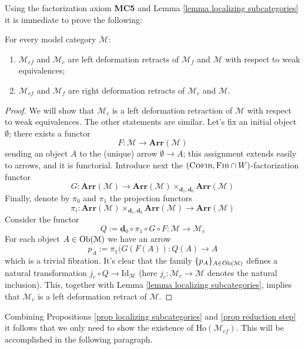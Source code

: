 \begin{refsection}
Using the factorization axiom {\bfseries MC5} and Lemma \ref{lemma localizing subcategories} it is immediate to prove the following:

\begin{prop} \label{prop reduction step}
For every model category $\mathcal M$:
\begin{enumerate}
\item $\mathcal M_{cf}$ and $\mathcal M_c$ are left deformation retracts of $\mathcal M_f$ and $\mathcal M$ with respect to weak equivalences;
\item $\mathcal M_{cf}$ and $\mathcal M_f$ are right deformation retracts of $\mathcal M_c$ and $\mathcal M$.
\end{enumerate}
\end{prop}

\begin{proof}
We will show that $\mathcal M_c$ is a left deformation retraction of $\mathcal M$ with respect to weak equivalences. The other statements are similar. Let's fix an initial object $\emptyset$; there exists a functor
\[
F \colon \mathcal M \to \mathbf{Arr}(\mathcal M)
\]
sending an object $A$ to the (unique) arrow $\emptyset \to A$; this assignment extends easily to arrows, and it is functorial. Introduce next the $(\textsc{Cofib},\textsc{Fib} \cap W)$-factorization functor
\[
G \colon \mathbf{Arr}(\mathcal M) \to \mathbf{Arr}(\mathcal M) \times_{\mathbf d_1, \mathbf d_0} \mathbf{Arr}(\mathcal M)
\]
Finally, denote by $\pi_0$ and $\pi_1$ the projection functors
\[
\pi_i \colon \mathbf{Arr}(\mathcal M) \times_{\mathbf d_1, \mathbf d_0} \mathbf{Arr}(\mathcal M) \to \mathbf{Arr}(\mathcal M)
\]
Consider the functor
\[
Q := \mathbf d_0 \circ \pi_1 \circ G \circ F \colon \mathcal M \to \mathcal M_c
\]
For each object $A \in \operatorname{Ob}(\mathcal M)$ we have an arrow
\[
p_A := \pi_1(G(F(A)) \colon Q(A) \to A
\]
which is a trivial fibration. It's clear that the family $\{p_A\}_{A \in \operatorname{Ob}(\mathcal M)}$ defines a natural transformation $j_c \circ Q \to \mathrm{Id}_{\mathcal M}$ (here $j_c \colon \mathcal M_c \to \mathcal M$ denotes the natural inclusion). This, together with Lemma \ref{lemma localizing subcategories}, implies that $\mathcal M_c$ is a left deformation retract of $\mathcal M$.
\end{proof}

Combining Propositions \ref{prop localizing subcategories} and \ref{prop reduction step} it follows that we only need to show the existence of $\mathrm{Ho}(\mathcal M_{cf})$. This will be accomplished in the following paragraph.


\end{refsection}
